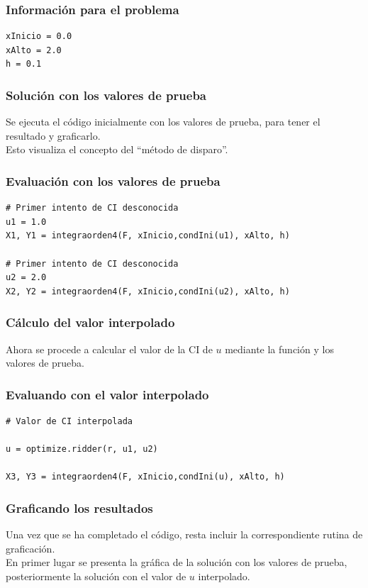 \documentclass[12pt]{beamer}
\begin{document}
\begin{frame}[fragile]
\frametitle{Información para el problema}
\begin{lstlisting}[caption=Declaración del intervalo y paso de integración]
xInicio = 0.0
xAlto = 2.0
h = 0.1
\end{lstlisting}
\end{frame}
\begin{frame}
\frametitle{Solución con los valores de prueba}
Se ejecuta el código inicialmente con los valores de prueba, para tener el resultado y graficarlo.
\\
\bigskip
\pause
Esto visualiza el concepto del \enquote{método de disparo}.
\end{frame}
\begin{frame}[fragile]
\frametitle{Evaluación con los valores de prueba}
\begin{lstlisting}[caption=Ocupando los valores de prueba]
# Primer intento de CI desconocida
u1 = 1.0
X1, Y1 = integraorden4(F, xInicio,condIni(u1), xAlto, h)

# Primer intento de CI desconocida
u2 = 2.0
X2, Y2 = integraorden4(F, xInicio,condIni(u2), xAlto, h)
\end{lstlisting}
\end{frame}
\begin{frame}
\frametitle{Cálculo del valor interpolado}
Ahora se procede a calcular el valor de la CI de $u$ mediante la función  y los valores de prueba.
\end{frame}
\begin{frame}[fragile]
\frametitle{Evaluando con el valor interpolado}
\begin{lstlisting}[caption=Calculando el valor interpolado para luego usarlo]
# Valor de CI interpolada

u = optimize.ridder(r, u1, u2)

X3, Y3 = integraorden4(F, xInicio,condIni(u), xAlto, h)
\end{lstlisting}
\end{frame}
\begin{frame}
\frametitle{Graficando los resultados}
Una vez que se ha completado el código, resta incluir la correspondiente rutina de graficación.
\\
\bigskip
\pause
En primer lugar se presenta la gráfica de la solución con los valores de prueba, posteriormente la solución con el valor de $u$ interpolado.
\end{frame}
\end{document}
